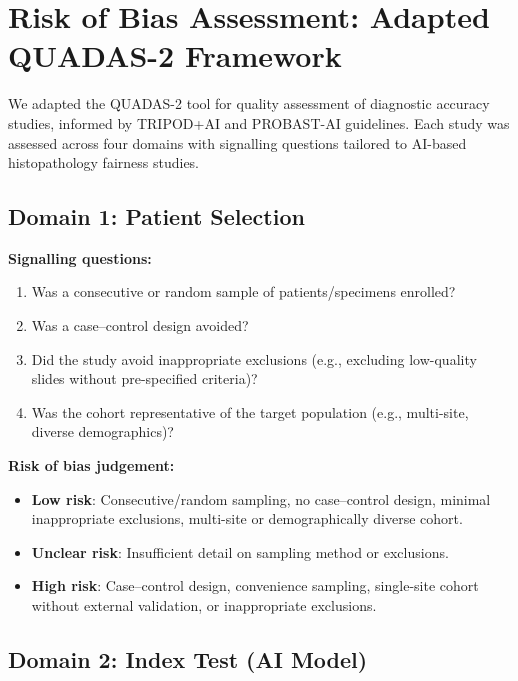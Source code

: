 \section{Risk of Bias Assessment: Adapted QUADAS-2 Framework}
\label{app:methods:quadas2}

We adapted the QUADAS-2 tool for quality assessment of diagnostic accuracy studies, informed by TRIPOD+AI and PROBAST-AI guidelines. Each study was assessed across four domains with signalling questions tailored to AI-based histopathology fairness studies.

\subsection*{Domain 1: Patient Selection}

\textbf{Signalling questions:}
\begin{enumerate}
  \item Was a consecutive or random sample of patients/specimens enrolled?
  \item Was a case--control design avoided?
  \item Did the study avoid inappropriate exclusions (e.g., excluding low-quality slides without pre-specified criteria)?
  \item Was the cohort representative of the target population (e.g., multi-site, diverse demographics)?
\end{enumerate}

\textbf{Risk of bias judgement:}
\begin{itemize}
  \item \textbf{Low risk}: Consecutive/random sampling, no case--control design, minimal inappropriate exclusions, multi-site or demographically diverse cohort.
  \item \textbf{Unclear risk}: Insufficient detail on sampling method or exclusions.
  \item \textbf{High risk}: Case--control design, convenience sampling, single-site cohort without external validation, or inappropriate exclusions.
\end{itemize}

\subsection*{Domain 2: Index Test (AI Model)}


